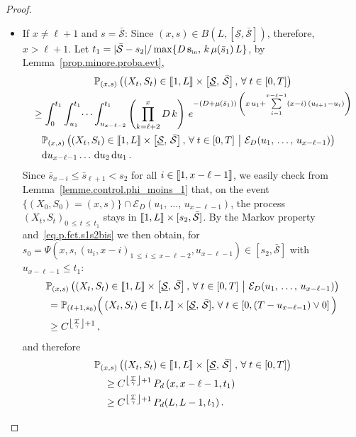 \documentclass[10pt]{amsart}
\theoremstyle{definition}\newtheorem{defi}[theo]{Definition}\newtheorem{rema}[theo]{Remark}\newtheorem{exam}[theo]{Example}\newtheorem{exem}[theo]{Example}\newtheorem{nota}[theo]{Notation}
\newcommand{\llbracket}{\mathopen{[\mkern -2.7mu[}}
\newcommand{\rrbracket}{\mathclose{]\mkern -2.7mu]}}
\newcommand{\PP}{\mathbb{P}}
\newcommand{\clE}{\mathcal{E}}
\newcommand{\Sin}{{\mathbf s}_{\textrm{\tiny\rm in}}}
\newcommand{\dif}{\mathrm{d}}
\newcommand{\Smin}{\underline{\mathcal{S}}}
\newcommand{\Smax}{\bar{\mathcal{S}}}
\newcommand{\barmu}{\mu(\bar s_1)}
\newcommand{\setunL}{\llbracket 1, L\rrbracket}
\newcommand{\1}{\mathbf{1}}
\let\oldforall\forall
\renewcommand*{\forall}{\mathrel{\oldforall}}
\begin{document}
\begin{proof}
\begin{itemize}
\item If $x\neq \ell+1$ and $s=\Smax$: Since $(x,s)\in B(L,[\Smin,\Smax])$, therefore, $x>\ell+1$. Let $t_1 = |\Smax-s_2|/\max\{D\,\Sin,\, k\,\barmu\,L\}$, by Lemma~\ref{prop.minore.proba.evt},
\begin{multline*}
\PP_{(x,s)}
\left(\left(X_t,S_t\right) \in \setunL \times \left[\Smin, \, \Smax\right], \,
\forall t\in[0,T]\right)
\\
\begin{aligned}
&
\geq \int_0^{t_1} \int_{u_1}^{t_1}\dots \int_{u_{x-\ell-2}}^{t_1}
\left(\prod_{k=\ell+2}^{x}D\,k\right)\, e^{-(D+\barmu)\,\left(x\,u_1+
\sum\limits_{i=1}^{x-\ell-1}(x-i)\,\left(u_{i+1}-u_{i}\right)\right)}\,
\\
&\quad
\PP_{(x,s)}
\left(\left(X_t,S_t\right) \in \setunL\times \left[\Smin, \, \Smax\right], \,
\forall t\in[0,T] \ \middle| \ \clE_D(u_1,\,\dots,\,u_{x-\ell-1})\right)\,
\\
& \quad
\dif u_{x-\ell-1}\dots\,\dif u_2\,\dif u_1\,.
\end{aligned}
\end{multline*}
Since $\bar s_{x-i}\leq \bar s_{\ell+1}<s_2$ for all $i\in \llbracket 1,x-\ell-1 \rrbracket$, we easily check from Lemma~\ref{lemme.control.phi_moins_1} that, on the event $\{(X_0,S_0)=(x,s)\}\cap\clE_D(u_1,\,\dots,\,u_{x-\ell-1})$, the process $(X_t,S_t)_{0\,\leq\,t\,\leq\,t_1}$ stays in $\setunL \times [s_2,\Smax]$. By the Markov property and~\eqref{eq.p.fct.s1s2bis} we then obtain, for $s_0=\Psi(x,s,(u_i,x-i)_{1\,\leq\,i\,\leq\,x-\ell-2},u_{x-\ell-1})\in [s_2,\Smax]$ with $u_{x-\ell-1}\leq t_1$:
\begin{multline*}
\PP_{(x,s)}
\left(\left(X_t,S_t\right) \in \setunL \times \left[\Smin, \, \Smax\right], \,
\forall t\in[0,T] \ \middle| \ \clE_D(u_1,\,\dots,\,u_{x-\ell-1})\right)
\\
\begin{aligned}
&= \PP_{(\ell+1,s_0)}
\Big(\left(X_t,S_t\right) \in \setunL \times [\Smin, \, \Smax], \,
\forall t\in\left[0,(T-u_{x-\ell-1})\vee 0\right] \Big)
\\
&\geq C^{\left\lfloor\frac{T}{\gamma}\right\rfloor+1}\,,
\end{aligned}
\end{multline*}
and therefore
\begin{align*}
& \PP_{(x,s)}
\left(\left(X_t,S_t\right) \in \setunL \times \left[\Smin, \, \Smax\right], \,
\forall t\in[0,T]\right)
\\
& \quad \geq C^{\left\lfloor\frac{T}{\gamma}\right\rfloor+1}
\,P_d\left(x,x-\ell-1, t_1\right)
\\
&
\quad\geq C^{\left\lfloor\frac{T}{\gamma}\right\rfloor+1}\, P_d(L,L-1, t_1)\,.
\end{align*}


\end{itemize}
\end{proof}
\end{document}
